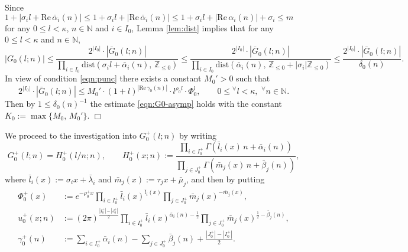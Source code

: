 \documentclass[a4paper,12pt]{article}
\theoremstyle{plain}
\def\rRe{\mathrm{Re}}
\def\N{\mathbb{N}}
\def\Z{\mathbb{Z}}
\def\vG{\varGamma}
\begin{document}
Since $1+ |\sigma_i l + \rRe \, \bar{\alpha}_i(n)| \le 1 + \sigma_i l + 
|\rRe \, \bar{\alpha}_i(n)| \le 1 + \sigma_i l + 
|\rRe \, \alpha_i(n)| + \sigma_i \le m$ for any $0 \le l < \kappa$, 
$n \in \N$ and $i \in I_0$, Lemma \ref{lem:dist} implies that for any 
$0 \le l < \kappa$ and $n \in \N$,  
\[
|G_0(l; n)| \le \dfrac{ 2^{|I_0|} \cdot |\bar{G}_0(l; n)|}{ \prod_{i \in I_0} 
\mathrm{dist}(\sigma_i l + \bar{\alpha}_i(n), \, \Z_{\le 0})} 
\le \dfrac{ 2^{|I_0|} \cdot |\bar{G}_0(l; n)|}{ \prod_{i \in I_0} 
\mathrm{dist}(\bar{\alpha}_i(n), \, \Z_{\le 0} + |\sigma_i| \Z_{\le 0})} 
\le \dfrac{ 2^{|I_0|} \cdot |\bar{G}_0(l; n)| }{ \delta_0(n) }.     
\]
In view of condition \eqref{eqn:punc} there exists a 
constant $M_0' > 0$ such that 
\[ 
2^{|I_0|} \cdot | \bar{G}_0(l; n) | \le M_0' \cdot (1+ l)^{|\rRe \, \gamma_0(n)|} 
\cdot l^{\rho_0 l} \cdot \Phi_0^l,   
\qquad 0 \le {}^{\forall} l < \kappa, \,\,  {}^{\forall} n \in \N. 
\]
Then by $1 \le \delta_0(n)^{-1}$ the estimate \eqref{eqn:G0-asymp} holds 
with the constant $K_0 := \max\{ M_0, \, M_0' \}$. \hfill $\Box$ \par\medskip 
We proceed to the investigation into $G_0^+(l; n)$ by writing    
\begin{equation} \label{eqn:Hp}
G_0^+(l; n) = H_0^+ \left( l/n ; n \right), \qquad 
H_0^+(x; n) := \dfrac{\prod_{i \in I_0^+}
 \vG( \bar{l}_i(x) \, n + \bar{\alpha}_i(n))}{\prod_{j \in J_0^+} 
\vG( \bar{m}_j(x) \, n + \bar{\beta}_j(n))},     
\end{equation}
where $\bar{l}_i(x) := \sigma_i x + \bar{\lambda}_i$ and 
$\bar{m}_j(x) := \tau_j x + \bar{\mu}_j$, and then by putting    
\begin{align*} 
\Phi_0^+(x) &:= e^{- \rho_0^+ x} \prod_{i \in I_0^+} \bar{l}_i(x)^{\bar{l}_i(x)} 
\prod_{j \in J_0^+} \bar{m}_j(x)^{-\bar{m}_j(x)},  \\
u_0^+(x; n) &:= (2 \pi)^{\frac{|I_0^+|-|J_0^+|}{2}} 
\prod_{i \in I_0^+} \bar{l}_i(x)^{\bar{\alpha}_i(n) - \frac{1}{2} } 
\prod_{j \in J_0^+} \bar{m}_j(x)^{ \frac{1}{2} - \bar{\beta}_j(n)},  \\
\gamma_0^+(n) &:= \sum_{i \in I_0^+} \bar{\alpha}_i(n) - 
\sum_{j \in J_0^+} \bar{\beta}_j(n) + \frac{|J_0^+|-|I_0^+|}{2}.   
\end{align*}
\end{document}
